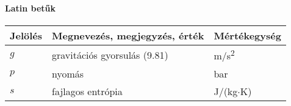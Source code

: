 \newcommand{\tss}{\textsuperscript}     %
\chapter*{\jelolesek}




\def\arraystretch{1.5}%

\subsubsection*{Latin betűk}
\begin{center}
    \begin{tabular}{lp{10cm}l}
        \hline
        Jelölés & Megnevezés, megjegyzés, érték & Mértékegység \\ 
        \hline
        $g$     & gravitációs gyorsulás (9.81)  & m/s\tss{2}     \\
        $p$     & nyomás                        & bar           \\
        $s$     & fajlagos entrópia             & J/(kg$\cdot$K)\\
        \hline
    \end{tabular}    
\end{center}



